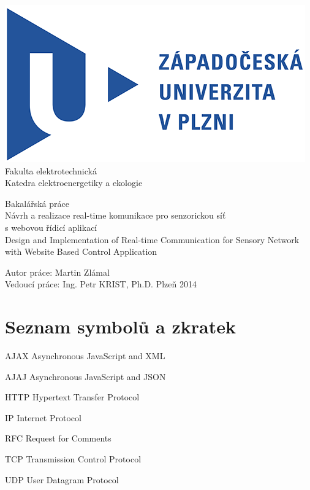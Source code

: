 \documentclass[oneside,12pt,a4paper]{book} %
\makeatletter
\newcommand{\tocfill}{\cleaders\hbox{$\m@th \mkern\@dotsep mu . \mkern\@dotsep mu$}\hfill}
\newcommand{\abbrlabel}[1]{\makebox[\textwidth /2][l]{\textbf{#1}\ \tocfill}}
\newenvironment{abbreviations}{\begin{list}{}{\renewcommand{\makelabel}{\abbrlabel}%
        \setlength{\labelwidth}{\textwidth /2}\setlength{\leftmargin}{\labelwidth+\labelsep}%
                                              \setlength{\itemsep}{0pt}}}{\end{list}}
\makeatother
\begin{document}
\pagestyle{empty}
\begin{titlepage}
\noindent
\includegraphics[scale=1]{zcu.png} \\[0.3cm]
Fakulta elektrotechnická \\
Katedra elektroenergetiky a ekologie
\vspace{5cm}
\begin{center}
	{\Huge\sc Bakalářská práce} \\
	\vspace{1cm}
	{\large Návrh a realizace real-time komunikace pro senzorickou síť\\s webovou řídicí aplikací\\}
	\vspace{1cm}
	{\large Design and Implementation of Real-time Communication for Sensory Network with Website Based Control Application}
\end{center}
\vfill
Autor práce: Martin Zlámal\\
Vedoucí práce: Ing. Petr KRIST, Ph.D. \hfill Plzeň 2014
\end{titlepage}

%



%

\tableofcontents
\cleardoublepage
{}
{}
\listoffigures



\chapter*{Seznam symbolů a zkratek}
\noindent
\begin{abbreviations}
\item[AJAX]	Asynchronous JavaScript and XML
\item[AJAJ]	Asynchronous JavaScript and JSON
\item[HTTP]	Hypertext Transfer Protocol
\item[IP]	Internet Protocol
\item[RFC]	Request for Comments
\item[TCP]	Transmission Control Protocol
\item[UDP]	User Datagram Protocol
\end{abbreviations}
\end{document}
